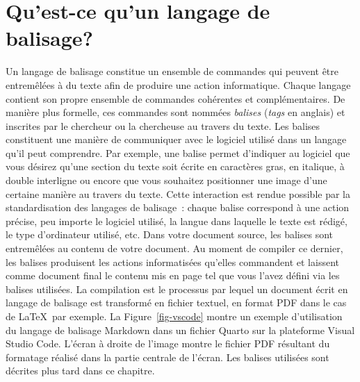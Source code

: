 \documentclass[
  letterpaper,
]{scrbook}
\begin{document}
\hypertarget{quest-ce-quun-langage-de-balisage}{%
\section{Qu'est-ce qu'un langage de
balisage?}\label{quest-ce-quun-langage-de-balisage}}

Un langage de balisage constitue un ensemble de commandes qui peuvent
être entremêlées à du texte afin de produire une action informatique.
Chaque langage contient son propre ensemble de commandes cohérentes et
complémentaires. De manière plus formelle, ces commandes sont nommées
\emph{balises} (\emph{tags} en anglais) et inscrites par le chercheur ou
la chercheuse au travers du texte. Les balises constituent une manière
de communiquer avec le logiciel utilisé dans un langage qu'il peut
comprendre. Par exemple, une balise permet d'indiquer au logiciel que
vous désirez qu'une section du texte soit écrite en caractères gras, en
italique, à double interligne ou encore que vous souhaitez positionner
une image d'une certaine manière au travers du texte. Cette interaction
est rendue possible par la standardisation des langages de balisage~:
chaque balise correspond à une action précise, peu importe le logiciel
utilisé, la langue dans laquelle le texte est rédigé, le type
d'ordinateur utilisé, etc. Dans votre document source, les balises sont
entremêlées au contenu de votre document. Au moment de compiler ce
dernier, les balises produisent les actions informatisées qu'elles
commandent et laissent comme document final le contenu mis en page tel
que vous l'avez défini via les balises utilisées. La compilation est le
processus par lequel un document écrit en langage de balisage est
transformé en fichier textuel, en format PDF dans le cas de \LaTeX~par
exemple. La Figure~\ref{fig-vscode} montre un exemple d'utilisation du
langage de balisage Markdown dans un fichier Quarto sur la plateforme
Visual Studio Code. L'écran à droite de l'image montre le fichier PDF
résultant du formatage réalisé dans la partie centrale de l'écran. Les
balises utilisées sont décrites plus tard dans ce chapitre.
\end{document}
